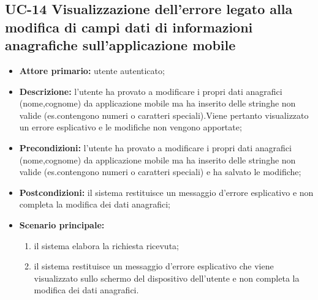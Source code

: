 \subsection{UC-14 Visualizzazione dell'errore legato alla modifica di campi dati di informazioni anagrafiche sull'applicazione mobile}
\begin{itemize}
	\item \textbf{Attore primario:} utente autenticato;

	\item \textbf{Descrizione:} l'utente ha provato a modificare i propri dati anagrafici (nome,cognome) da applicazione mobile ma ha inserito delle stringhe non valide (es.contengono numeri o caratteri speciali).Viene pertanto visualizzato un errore esplicativo e le modifiche non vengono apportate;

	\item \textbf{Precondizioni:} l'utente ha provato a modificare i propri dati anagrafici (nome,cognome) da applicazione mobile ma ha inserito delle stringhe non valide (es.contengono numeri o caratteri speciali) e ha salvato le modifiche;

	\item \textbf{Postcondizioni:} il sistema restituisce un messaggio d'errore esplicativo e non completa la modifica dei dati anagrafici;

	\item \textbf{Scenario principale:}
	
		\begin{enumerate}
   			 \item il sistema elabora la richiesta ricevuta;
    		 \item il sistema restituisce un messaggio d'errore esplicativo che viene visualizzato sullo schermo del dispositivo dell'utente e non completa la modifica dei dati anagrafici.
		\end{enumerate}
\end{itemize}

